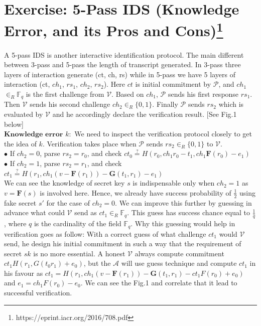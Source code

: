 \documentclass{article}
\begin{document}
\section*{Exercise: 5-Pass IDS (Knowledge Error, and its Pros and Cons)\footnote{https://eprint.iacr.org/2016/708.pdf}}
A 5-pass IDS is another interactive identification protocol. The main different between 3-pass and 5-pass the length of transcript generated. In 3-pass three layers of interaction generate (ct, ch, rs) while in 5-pass we have 5 layers of interaction (ct, $ch_1$, $rs_1$, $ch_2$, $rs_2$). Here $ct$ is initial commitment by $\mathcal{P}$, and $ch_1$ $\in_R \mathbb{F}_q$ is the first challenge from $\mathcal{V}$. Based on $ch_1$, $\mathcal{P}$ sends his first response $rs_1$. Then $\mathcal{V}$ sends his second challenge $ch_2 \in_R \{0,1\}$. Finally $\mathcal{P}$ sends $rs_2$ which is evaluated by $\mathcal{V}$ and he accordingly declare the verification result. [See Fig.1 below]\\
$\textbf{Knowledge\ error}$ $k:$ We need to inspect the verification protocol closely to get the idea of $k$. Verification takes place when $\mathcal{P}$ sends $rs_2 \in_R \{0,1\}$ to $\mathcal{V}$.\\
$\bullet$ If $ch_2 =0$, parse $rs_2 = r_0$, and check $ct_0 \stackrel{?}{=} H(r_0,ch_1r_0-t_1, ch_1\textbf{F}(r_0)-e_1)$\\
$\bullet$ If $ch_2 =1$, parse $rs_2 = r_1$, and check $ct_1 \stackrel{?}{=} H(r_1, ch_1(v- \textbf{F}(r_1)) - \textbf{G}(t_1,r_1)-e_1)$\\
We can see the knowledge of secret key $s$ is indispensable only when $ch_2=1$ as $v=\textbf{F}(s)$ is involved here. Hence, we already have success probability of $\frac{1}{2}$ using fake secret $s'$ for the case of $ch_2=0$. We can improve this further by guessing in advance what could $\mathcal{V}$ send as $ct_1 \in_R \mathbb{F}_q$. This guess has success chance equal to $\frac{1}{q}$, where $q$ is the cardinality of the field $\mathbb{F}_q$. Why this guessing would help in verification goes as follow: With a correct guess of what challenge $ct_1$ would $\mathcal{V}$ send, he design his initial commitment in such a way that the requirement of secret $sk$ is no more essential. A honest $\mathcal{V}$ always compute commitment $ct_1 H(r_1, G(t_0r_1)+e_0)$, but the $\mathcal{A}$ will use guess technique and compute $ct_1$ in his favour as $ct_1 = H(r_1, ch_1(v- \textbf{F}(r_1)) - \textbf{G}(t_1,r_1)-ct_1F(r_0)+e_0)$ and $e_1 = ch_1F(r_0)-e_0$. We can see the Fig.1 and correlate that it lead to successful verification.\\ 
\end{document}
